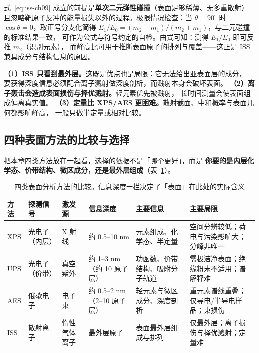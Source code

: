 \begin{keycond}
式~\eqref{eq:iss-ch09} 成立的前提是\textbf{单次二元弹性碰撞}（表面足够稀薄、无多重散射）
且忽略靶原子反冲的能量损失以外的过程。极限情况检查：当 $\theta=90^{\circ}$ 时
$\cos\theta=0$，取正号分支化简得
$E_1/E_0=(m_2-m_1)/(m_2+m_1)$，与二元碰撞的标准结果一致，
可作为公式与符号约定的自检。由式可知：测得 $E_1/E_0$ 即可反推 $m_2$（识别元素），
而峰高比可用于推断表面原子的排列与覆盖——这正是 ISS 兼具成分与结构信息的原因。
\end{keycond}

\begin{pitfall}
\textbf{（1）ISS 只看到最外层。}这既是优点也是局限：它无法给出亚表面层的成分，
要获得深度信息必须配合离子溅射做深度剖析，而溅射本身会破坏表面。
\textbf{（2）离子轰击会造成表面损伤与择优溅射。}轻元素优先被溅射，
长时间测量会使表面组成偏离真实值。
\textbf{（3）定量比 XPS/AES 更困难。}散射截面、中和概率与表面几何都影响峰高，
一般只做半定量或相对比较。
\end{pitfall}

\subsection{四种表面方法的比较与选择}

把本章四类方法放在一起看，选择的依据不是「哪个更好」，而是
\textbf{你要的是内层化学态、价带结构、微区成分，还是最外层组成}（表~\ref{tab:surface-compare}）。

\begin{table}[tbp]
\centering
\caption{四类表面分析方法的比较。信息深度一栏决定了「表面」在此处的实际含义}
\label{tab:surface-compare}
{\srcsize
\begin{tabularx}{\twocolwidth}{@{}p{16mm}p{26mm}p{20mm}p{16mm}p{30mm}X@{}}
\toprule
方法 & 探测信号 & 激发源 & 信息深度 & 主要信息 & 主要局限 \\
\midrule
XPS & 光电子（内层） & X 射线 & 约 0.5--10 nm & 元素组成、化学态、半定量 & 空间分辨较低；荷电与污染影响大；分峰非唯一 \\
UPS & 光电子（价带） & 真空紫外 & 约 1--3 nm（约 10 原子层） & 功函数、价带结构、吸附分子轨道 & 需极洁净表面；绝缘粉末不适用；谱解释难 \\
AES & 俄歇电子 & 电子束 & 约 0.5--2 nm（2--10 原子层） & 轻元素与微区成分、深度剖析 & 重元素谱线重叠；仅导电/半导电样品；束损伤 \\
ISS & 散射离子 & 惰性气体离子 & 最外层原子 & 表面最外层组成与排列 & 仅最外层；离子损伤与择优溅射；定量难 \\
\bottomrule
\end{tabularx}}
\end{table}

